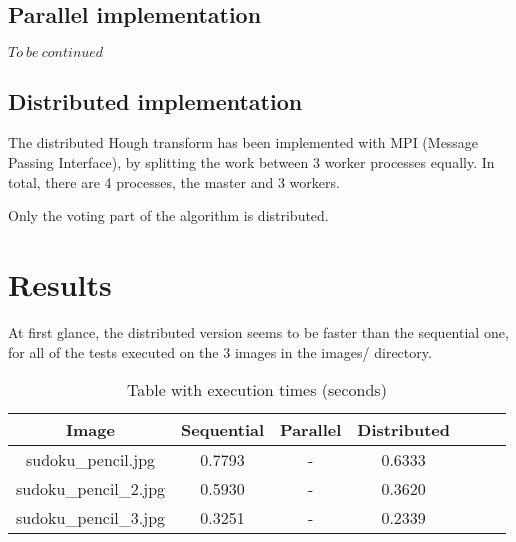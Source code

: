\documentclass[journal, onecolumn, 12pt]{IEEEtran}
\begin{document}
\subsection{Parallel implementation}
$ To\ be\ continued $

\subsection{Distributed implementation}
The distributed Hough transform has been implemented with MPI (Message Passing Interface), by splitting the work between 3 worker processes equally. In total, there are 4 processes, the master and 3 workers. 

Only the voting part of the algorithm is distributed.


\section{Results}
At first glance, the distributed version seems to be faster than the sequential one, for all of the tests executed on the 3 images in the images/ directory. 

\begin{table}[ht]
		\caption{Table with execution times (seconds)} 
\begin{tabular}{c c c c c c c} 
\hline\hline                        
		Image & Sequential & Parallel & Distributed &\\ [2ex]
\hline\hline                               
		sudoku\_pencil.jpg & 0.7793 & - & 0.6333 \\       
		sudoku\_pencil\_2.jpg & 0.5930 & - & 0.3620 \\       
		sudoku\_pencil\_3.jpg & 0.3251 & - & 0.2339\\       
\hline\hline                        
\end{tabular}
\end{table}
	


\vspace{12pt}
\end{document}
